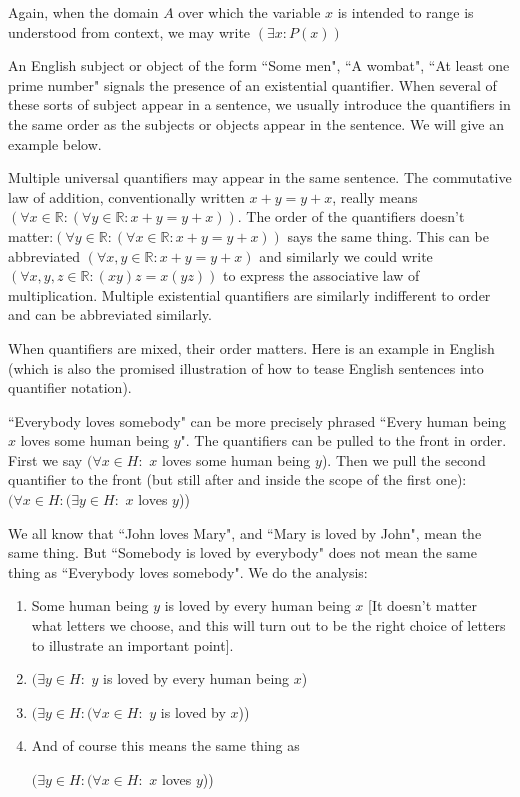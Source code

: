 \documentclass[12pt]{article}
\begin{document}
Again, when the domain $A$ over which the variable $x$ is intended to range is understood from context, we may write 
$(\exists x:P(x))$

An English subject or object of the form ``Some men",  ``A wombat", ``At least one prime number" signals the presence of an existential quantifier.
When several of these sorts of subject appear in a sentence, we usually introduce the quantifiers in the same order as the subjects or objects
appear in the sentence.  We will give an example below.

Multiple universal quantifiers may appear in the same sentence.  The commutative law of addition, conventionally written $x+y=y+x$, really means
$(\forall x \in {\mathbb R}:(\forall y \in {\mathbb R}: x+y=y+x))$.  The order of the quantifiers doesn't matter:$(\forall y \in {\mathbb R}:(\forall x \in {\mathbb R}: x+y=y+x))$ says the same thing.  This can be abbreviated $(\forall x,y\in {\mathbb R}:x+y=y+x)$ and similarly we could write $(\forall x,y,z\in {\mathbb R}:(xy)z=x(yz))$ to express the associative law of multiplication.  Multiple existential quantifiers are similarly indifferent to order and can be abbreviated similarly.

When quantifiers are mixed, their order matters.  Here is an example in English (which is also the promised illustration of how to tease English sentences into quantifier notation).

``Everybody loves somebody" can be more precisely phrased ``Every human being $x$ loves some human being $y$".  The quantifiers can be pulled to the front in order.  First we say $(\forall x \in H:$  $x$ loves some human being $y$).  Then we pull the second quantifier to the front (but still after and inside the scope of the first one):  $(\forall x \in H:(\exists y \in H:$ $x$ loves $y$))

We all know that ``John loves Mary", and ``Mary is loved by John", mean the same thing.  But ``Somebody is loved by everybody" does not mean the same thing as ``Everybody loves somebody".  We do the analysis:
\begin{enumerate}
\item Some human being $y$ is loved by every human being $x$ [It doesn't matter what letters we choose, and this will turn out to be the right choice of letters to illustrate an important point].

\item $(\exists y \in H:$ $y$ is loved by every human being $x$)

\item $(\exists y\in H:(\forall x \in H:$ $y$ is loved by $x$))

\item And of course this means the same thing as \begin{center}$(\exists y\in H:(\forall x \in H:$ $x$ loves $y$))\end{center}
\end{enumerate}
\end{document}
